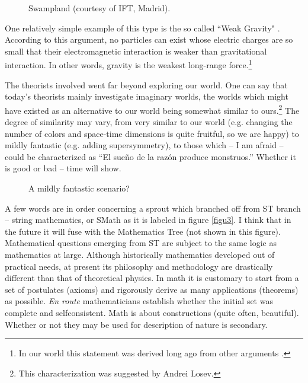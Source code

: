 \documentclass[epsfig,12pt]{article}
\begin{document}

\begin{figure}[h]
\epsfxsize=10cm
\centerline{}
\caption{\small
Swampland (courtesy of IFT, Madrid).}
\label{figu1o}
\end{figure}


One relatively simple example of this type is the so called ``Weak Gravity" \cite{wg}. According to this argument, no particles can exist whose electric charges are so small that
their electromagnetic interaction is weaker than gravitational interaction. In other words, gravity is the weakest long-range force.\footnote{In our world this statement was derived long ago from other arguments \cite{OVZ}.} 

The theorists involved went far beyond exploring our world.  One can say that today's theorists mainly investigate imaginary worlds, the worlds  which might have existed as an alternative to our world being somewhat similar to ours.\footnote{This characterization was suggested by Andrei  Losev.} The degree of similarity may vary, from very similar to our  world (e.g. changing the number of colors and space-time dimensions is quite fruitful, so we are happy) to mildly fantastic (e.g. adding supersymmetry), to those which  -- I am afraid -- could  be characterized as 	``El sue\~no de la raz\'on produce monstruos.'' Whether it is good or bad --  time will show.

\begin{figure}[h]
\epsfxsize=10cm
\vspace{-2mm}
\centerline{}
\vspace{-6mm}
\caption{\small
A mildly fantastic scenario? }
\label{figu1ok}
\end{figure}


A few words are in order concerning a sprout which branched off from ST branch -- string mathematics, or SMath as it is labeled in figure \ref{figu3}. I think that in the future it will fuse with \label{p6} the
Mathematics Tree (not shown in this figure). Mathematical questions emerging from ST are subject to the same logic as mathematics at large. Although historically mathematics developed out of practical needs, at present its philosophy and methodology are drastically different than that of theoretical physics. In math it is customary to start from a set of postulates (axioms) and rigorously derive as many applications (theorems) as possible. {\em En route} mathematicians establish whether the initial set was complete and selfconsistent. Math is about constructions (quite often, beautiful). Whether or not they may be used for description of nature is secondary.
\end{document}

